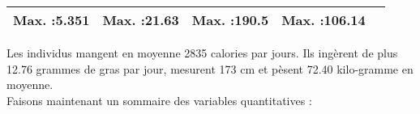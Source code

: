 \documentclass[
]{article}
\begin{document}
\begin{longtable}[]{@{}ccccc@{}}
\begin{minipage}[t]{0.17\columnwidth}
Max. :5.351\strut
\end{minipage} & \begin{minipage}[t]{0.17\columnwidth}\centering
Max. :21.63\strut
\end{minipage} & \begin{minipage}[t]{0.17\columnwidth}\centering
Max. :190.5\strut
\end{minipage} & \begin{minipage}[t]{0.18\columnwidth}\centering
Max. :106.14\strut
\end{minipage}\tabularnewline
\bottomrule
\end{longtable}

Les individus mangent en moyenne 2835 calories par jours. Ils ingèrent
de plus 12.76 grammes de gras par jour, mesurent 173 cm et pèsent 72.40
kilo-gramme en moyenne.\\

Faisons maintenant un sommaire des variables quantitatives :
\end{document}
